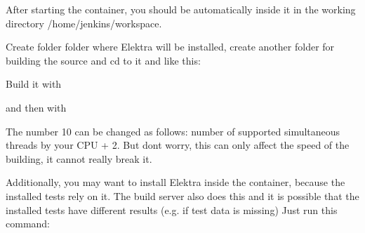 \begin{DoxyCode}{0}
\end{DoxyCode}


After starting the container, you should be automatically inside it in the working directory {\ttfamily /home/jenkins/workspace}.

Create folder folder where Elektra will be installed, create another folder for building the source and {\ttfamily cd} to it and like this\+:


\begin{DoxyCode}{0}
\end{DoxyCode}


Build it with


\begin{DoxyCode}{0}
\end{DoxyCode}


and then with


\begin{DoxyCode}{0}
\end{DoxyCode}


The number 10 can be changed as follows\+: number of supported simultaneous threads by your C\+PU + 2. But don\textquotesingle{}t worry, this can only affect the speed of the building, it cannot really break it.

Additionally, you may want to install Elektra inside the container, because the installed tests rely on it. The build server also does this and it is possible that the installed tests have different results (e.\+g. if test data is missing) Just run this command\+:


